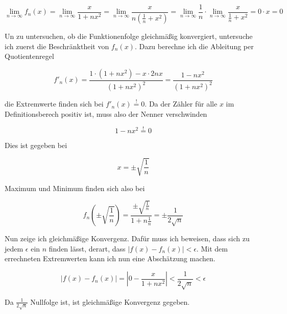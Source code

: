 \documentclass[a4paper,german,12pt,smallheadings]{scrartcl}
\begin{document}
\begin{equation*}
  \lim_{n \to \infty} f_n(x) = \lim_{n \to \infty} \frac{x}{1+nx^2} = \lim_{n \to \infty} \frac{x}{n \left(\frac{1}{n} + x^2\right)} = \lim_{n \to \infty} \frac{1}{n} \cdot \lim_{n \to \infty} \frac{x}{\frac{1}{n} + x^2} = 0 \cdot x = 0
\end{equation*}

Un zu untersuchen, ob die Funktionenfolge gleichmäßig konvergiert, untersuche ich zuerst die Beschränktheit von $f_n(x)$. Dazu berechne ich die Ableitung per Quotientenregel

\begin{equation*}
  f'_n(x) = \frac{1 \cdot (1+nx^2) - x \cdot 2nx}{(1+nx^2)^2} = \frac{1-nx^2}{(1+nx^2)^2}
\end{equation*}

die Extremwerte finden sich bei $f'_n(x) \overset{!}{=} 0$. Da der Zähler für
alle $x$ im Definitionsberech positiv ist, muss also der Nenner verschwinden

\begin{equation*}
  1-nx^2 \overset{!}{=} 0
\end{equation*}

Dies ist gegeben bei

\begin{equation}
  x = \pm \sqrt{\frac{1}{n}}
\end{equation}

Maximum und Minimum finden sich also bei

\begin{equation*}
  f_n\left(\pm\sqrt{\frac{1}{n}}\right) = \frac{\pm\sqrt{\frac{1}{n}}}{1+n\frac{1}{n}} = \pm\frac{1}{2\sqrt{n}}
\end{equation*}

Nun zeige ich gleichmäßige Konvergenz. Dafür muss ich beweisen, dass sich zu
jedem $\epsilon$ ein $n$ finden lässt, derart, dass $\left| f(x) - f_n(x)
\right| < \epsilon$. Mit dem errechneten Extremwerten kann ich nun eine
Abschätzung machen.

\begin{equation*}
  \left| f(x) - f_n(x) \right| = \left|0-\frac{x}{1+nx^2}\right| < \frac{1}{2\sqrt{n}} < \epsilon
\end{equation*}

Da $\frac{1}{2\sqrt{n}}$ Nullfolge ist, ist gleichmäßige Konvergenz gegeben.
\end{document}
